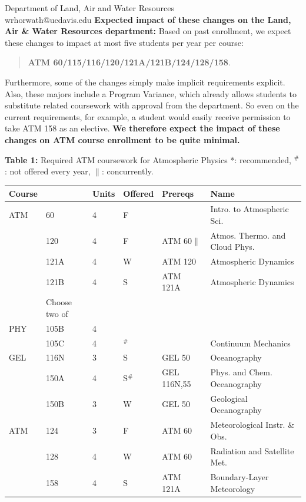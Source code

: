 \documentclass[letterpaper,12pt]{letter}
\begin{document}
\begin{letter}{Department of Land, Air and Water Resources \\ wrhorwath@ucdavis.edu}
{\bf Expected impact of these changes on the Land, Air \& Water Resources department:}
Based on past enrollment, we expect these changes to impact at most
five students per year per course:
\begin{quote}
{\bf ATM 60/115/116/120/121A/121B/124/128/158}.
\end{quote}
Furthermore, some of the changes simply make implicit requirements
explicit.  Also, these majors include a Program Variance, which
already allows students to substitute related coursework with approval
from the department.  So even on the current requirements, for
example, a student would easily receive permission to take ATM 158 as
an elective.
{\bf We therefore expect the impact of these changes on ATM course
  enrollment to be quite minimal.}

\newpage
{\bf Table 1:}  Required ATM coursework for Atmospheric Physics
\vskip 0.25cm
\noindent
*: recommended, $^\#$: not offered every year, $\parallel$: concurrently.\\
\begin{tabular}{|llllll|}
\hline
Course & & Units & Offered & Prereqs & Name \\
\hline
ATM & 60     & 4 & F   & & Intro. to Atmospheric Sci. \\
    & 120    & 4 & F   & ATM 60$\parallel$ & Atmos. Thermo. and Cloud Phys. \\
    & 121A   & 4 & W   & ATM 120 & Atmospheric Dynamics \\
    & 121B   & 4 & S   & ATM 121A & Atmospheric Dynamics \\
\hline
\hline
    & Choose two of & & & & \\
\hline
PHY  & 105B   & 4 & & & \\
     & 105C   & 4 & $^\#$  &             & Continuum Mechanics\\
GEL  & 116N   & 3 & S  & GEL 50      & Oceanography\\
     & 150A   & 4 & S$^\#$ & GEL 116N,55 & Phys. and Chem. Oceanography\\
     & 150B   & 3 & W  & GEL 50      & Geological Oceanography\\
ATM  & 124    & 3 & F  & ATM 60      & Meteorological Instr. \& Obs. \\
     & 128    & 4 & W  & ATM 60      & Radiation and Satellite Met. \\
     & 158    & 4 & S  & ATM 121A    & Boundary-Layer Meteorology \\
\hline
\end{tabular}\\


\end{letter}
\end{document}
